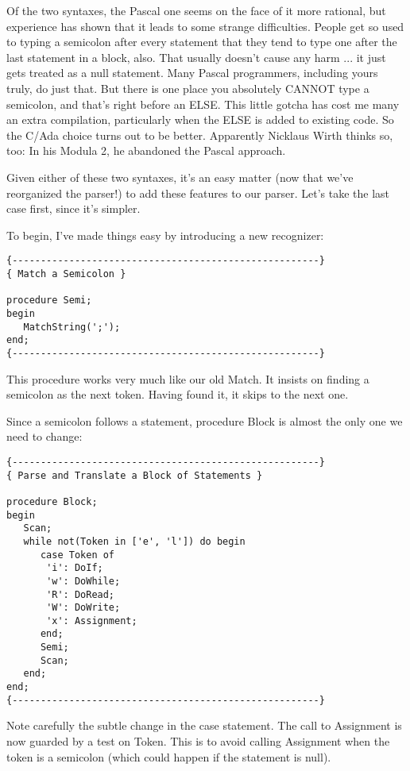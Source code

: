 Of  the two syntaxes, the Pascal one seems on the face of it more rational, but experience has shown  that it leads to some strange difficulties. People get  so  used  to  typing a semicolon after every  statement  that  they tend to  type  one  after  the  last statement in a block, also. That usually doesn't cause  any harm ... it  just gets treated as a  null  statement. Many  Pascal programmers, including yours truly, do  just  that. But there is one  place you absolutely CANNOT type  a  semicolon, and  that's right before an ELSE. This little gotcha  has  cost  me  many an extra  compilation, particularly  when  the  ELSE  is  added  to existing code. So  the  C/Ada  choice  turns out to be better. Apparently Nicklaus Wirth thinks so, too:  In his  Modula  2, he abandoned the Pascal approach.

Given either of these two syntaxes, it's an easy matter (now that we've  reorganized  the  parser!) to add these  features  to  our parser. Let's take the last case first, since it's simpler.

To begin, I've made things easy by introducing a new recognizer:

\begin{verbatim}
{------------------------------------------------------}
{ Match a Semicolon }

procedure Semi;
begin
   MatchString(';');
end;
{------------------------------------------------------}
\end{verbatim}

This procedure works very much like our old Match. It insists on finding a semicolon as the next token. Having found it, it skips to the next one.

Since a  semicolon follows a statement, procedure Block is almost the only one we need to change:

\begin{verbatim}
{------------------------------------------------------}
{ Parse and Translate a Block of Statements }

procedure Block;
begin
   Scan;
   while not(Token in ['e', 'l']) do begin
      case Token of
       'i': DoIf;
       'w': DoWhile;
       'R': DoRead;
       'W': DoWrite;
       'x': Assignment;
      end;
      Semi;
      Scan;
   end;
end;
{------------------------------------------------------}
\end{verbatim}

Note carefully the subtle change in the case statement. The call to  Assignment  is now guarded by a test on Token. This  is  to avoid calling Assignment when the  token  is  a  semicolon (which could happen if the statement is null).

